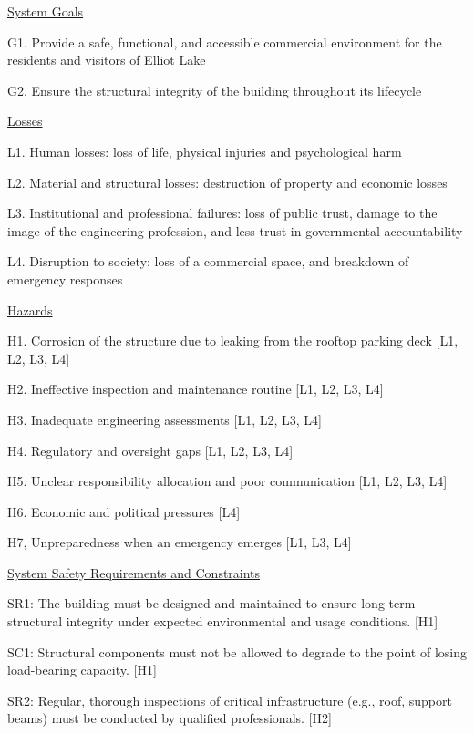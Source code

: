 \documentclass[12pt]{article}
\begin{document}


\underline{System Goals}

G1. Provide a safe, functional, and accessible commercial environment for the residents and visitors of Elliot Lake

G2. Ensure the structural integrity of the building throughout its lifecycle

\underline{Losses}

L1. Human losses: loss of life, physical injuries and psychological harm

L2. Material and structural losses: destruction of property and economic losses

L3. Institutional and professional failures: loss of public trust, damage to the image of the engineering profession, and less trust in governmental accountability

L4. Disruption to society: loss of a commercial space, and breakdown of emergency responses

\underline{Hazards}

H1. Corrosion of the structure due to leaking from the rooftop parking deck [L1, L2, L3, L4]

H2. Ineffective inspection and maintenance routine [L1, L2, L3, L4]

H3. Inadequate engineering assessments [L1, L2, L3, L4]

H4. Regulatory and oversight gaps [L1, L2, L3, L4]

H5. Unclear responsibility allocation and poor communication [L1, L2, L3, L4]

H6. Economic and political pressures [L4]

H7, Unpreparedness when an emergency emerges [L1, L3, L4]

\underline{System Safety Requirements and Constraints}

SR1: The building must be designed and maintained to ensure long-term structural integrity under expected environmental and usage conditions. [H1]

SC1: Structural components must not be allowed to degrade to the point of losing load-bearing capacity. [H1]

SR2: Regular, thorough inspections of critical infrastructure (e.g., roof, support beams) must be conducted by qualified professionals. [H2]
\end{document}
